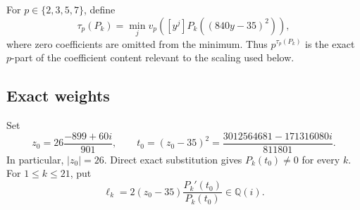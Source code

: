 \documentclass[preprint,12pt]{elsarticle}
\theoremstyle{definition}
\newcommand{\Q}{\mathbb Q}
\begin{document}
For $p\in\{2,3,5,7\}$, define
\begin{equation}\label{eq:profile-definition}
 \tau_p(P_k)=
 \min_j v_p\!\left([y^j]P_k((840y-35)^2)\right),
\end{equation}
where zero coefficients are omitted from the minimum.  Thus
$p^{\tau_p(P_k)}$ is the exact $p$-part of the coefficient content relevant
to the scaling used below.

\subsection{Exact weights}

Set
\begin{equation}\label{eq:z0}
 z_0=26\frac{-899+60i}{901},
 \qquad
 t_0=(z_0-35)^2
 =\frac{3012564681-171316080i}{811801}.
\end{equation}
In particular, $|z_0|=26$.  Direct exact substitution gives
$P_k(t_0)\ne0$ for every $k$.  For $1\le k\le21$, put
\begin{equation}\label{eq:ellk}
 \ell_k=
 2(z_0-35)\frac{P_k'(t_0)}{P_k(t_0)}\in\Q(i).
\end{equation}
\end{document}

